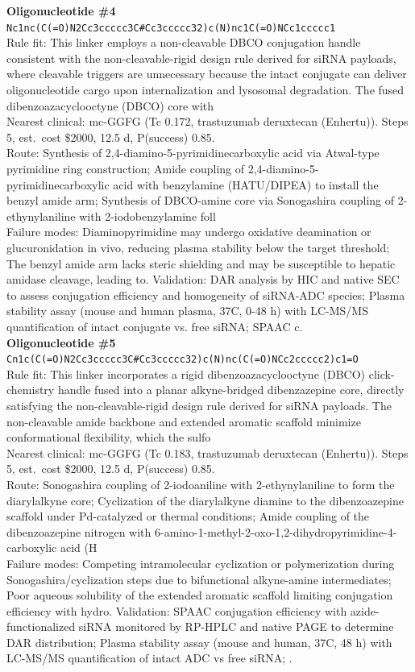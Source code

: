 \documentclass[10pt]{article}
\begin{document}
\noindent\textbf{Oligonucleotide \#4} \\ \texttt{Nc1nc(C(=O)N2Cc3ccccc3C\#Cc3ccccc32)c(N)nc1C(=O)NCc1ccccc1} \\ Rule fit: This linker employs a non-cleavable DBCO conjugation handle consistent with the non-cleavable-rigid design rule derived for siRNA payloads, where cleavable triggers are unnecessary because the intact conjugate can deliver oligonucleotide cargo upon internalization and lysosomal degradation. The fused dibenzoazacyclooctyne (DBCO) core with \\ Nearest clinical: mc-GGFG (Tc 0.172, trastuzumab deruxtecan (Enhertu)). Steps 5, est.\ cost \$2000, 12.5 d, P(success) 0.85. \\ Route: Synthesis of 2,4-diamino-5-pyrimidinecarboxylic acid via Atwal-type pyrimidine ring construction; Amide coupling of 2,4-diamino-5-pyrimidinecarboxylic acid with benzylamine (HATU/DIPEA) to install the benzyl amide arm; Synthesis of DBCO-amine core via Sonogashira coupling of 2-ethynylaniline with 2-iodobenzylamine foll \\ Failure modes: Diaminopyrimidine may undergo oxidative deamination or glucuronidation in vivo, reducing plasma stability below the target threshold; The benzyl amide arm lacks steric shielding and may be susceptible to hepatic amidase cleavage, leading to. Validation: DAR analysis by HIC and native SEC to assess conjugation efficiency and homogeneity of siRNA-ADC species; Plasma stability assay (mouse and human plasma, 37\textdegree{}C, 0-48 h) with LC-MS/MS quantification of intact conjugate vs. free siRNA; SPAAC c. \\[0.4em]
\noindent\textbf{Oligonucleotide \#5} \\ \texttt{Cn1c(C(=O)N2Cc3ccccc3C\#Cc3ccccc32)c(N)nc(C(=O)NCc2ccccc2)c1=O} \\ Rule fit: This linker incorporates a rigid dibenzoazacyclooctyne (DBCO) click-chemistry handle fused into a planar alkyne-bridged dibenzazepine core, directly satisfying the non-cleavable-rigid design rule derived for siRNA payloads. The non-cleavable amide backbone and extended aromatic scaffold minimize conformational flexibility, which the sulfo \\ Nearest clinical: mc-GGFG (Tc 0.183, trastuzumab deruxtecan (Enhertu)). Steps 5, est.\ cost \$2000, 12.5 d, P(success) 0.85. \\ Route: Sonogashira coupling of 2-iodoaniline with 2-ethynylaniline to form the diarylalkyne core; Cyclization of the diarylalkyne diamine to the dibenzoazepine scaffold under Pd-catalyzed or thermal conditions; Amide coupling of the dibenzoazepine nitrogen with 6-amino-1-methyl-2-oxo-1,2-dihydropyrimidine-4-carboxylic acid (H \\ Failure modes: Competing intramolecular cyclization or polymerization during Sonogashira/cyclization steps due to bifunctional alkyne-amine intermediates; Poor aqueous solubility of the extended aromatic scaffold limiting conjugation efficiency with hydro. Validation: SPAAC conjugation efficiency with azide-functionalized siRNA monitored by RP-HPLC and native PAGE to determine DAR distribution; Plasma stability assay (mouse and human, 37\textdegree{}C, 48 h) with LC-MS/MS quantification of intact ADC vs free siRNA; . \\[0.4em]
\end{document}
